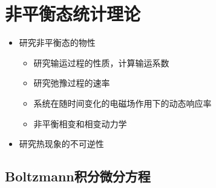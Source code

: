\chapter{非平衡态统计理论}

\begin{itemize}
    \item 研究非平衡态的物性
    \begin{itemize}
        \item 研究输运过程的性质，计算输运系数
        \item 研究弛豫过程的速率
        \item 系统在随时间变化的电磁场作用下的动态响应率
        \item 非平衡相变和相变动力学
    \end{itemize}
    \item 研究热现象的不可逆性
\end{itemize}

\section{Boltzmann积分微分方程}

